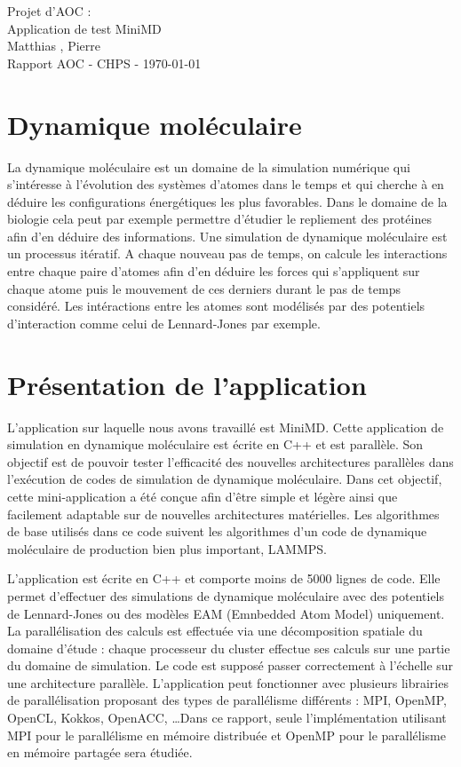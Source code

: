 \documentclass[11pt,a4paper]{article}
\begin{document}
\begin{center}

	{\LARGE\centering Projet d'AOC :\\ Application de test MiniMD}\\[1cm]

	{ Matthias , Pierre }\\[0.5cm]
	{Rapport AOC - CHPS - \today}\\[2cm]
\end{center}

\tableofcontents
\newpage

\section{Dynamique moléculaire}
	La dynamique moléculaire est un domaine de la simulation numérique qui s'intéresse à l'évolution des systèmes d'atomes dans le temps et qui cherche à en déduire les configurations énergétiques les plus favorables. Dans le domaine de la biologie cela peut par exemple permettre d'étudier le repliement des protéines afin d'en déduire des informations.
	Une simulation de dynamique moléculaire est un processus itératif. A chaque nouveau pas de temps, on calcule les interactions entre chaque paire d'atomes afin d'en déduire les forces qui s'appliquent sur chaque atome puis le mouvement de ces derniers durant le pas de temps considéré. Les intéractions entre les atomes sont modélisés par des potentiels d'interaction comme celui de Lennard-Jones par exemple.

\section{Présentation de l'application}
	L'application sur laquelle nous avons travaillé est MiniMD. Cette application de simulation en dynamique moléculaire est écrite en C++ et est parallèle. Son objectif est de pouvoir tester l'efficacité des nouvelles architectures parallèles dans l'exécution de codes de simulation de dynamique moléculaire. Dans cet objectif, cette mini-application a été conçue afin d'être simple et légère ainsi que facilement adaptable sur de nouvelles architectures matérielles. Les algorithmes de base utilisés dans ce code suivent les algorithmes d'un code de dynamique moléculaire de production bien plus important, LAMMPS.

	L'application est écrite en C++ et comporte moins de 5000 lignes de code. Elle permet d'effectuer des simulations de dynamique moléculaire avec des potentiels de Lennard-Jones ou des modèles EAM (Emnbedded Atom Model) uniquement. La parallélisation des calculs est effectuée via une décomposition spatiale du domaine d'étude : chaque processeur du cluster effectue ses calculs sur une partie du domaine de simulation. Le code est supposé passer correctement à l'échelle  sur une architecture parallèle. L'application peut fonctionner avec plusieurs librairies de parallélisation proposant des types de parallélisme différents : MPI, OpenMP, OpenCL, Kokkos, OpenACC, \ldots Dans ce rapport, seule l'implémentation utilisant MPI pour le parallélisme en mémoire distribuée et OpenMP pour le parallélisme en mémoire partagée sera étudiée.
\end{document}
